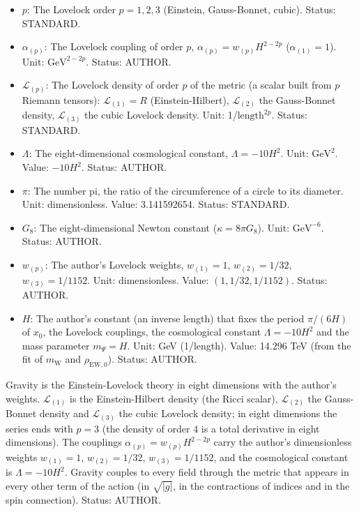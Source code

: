 \documentclass[
  10pt,
]{article}
\begin{document}
\begin{itemize}
\item
  \(p\): The Lovelock order \(p = 1, 2, 3\) (Einstein, Gauss-Bonnet,
  cubic). Status: STANDARD.
\item
  \(\alpha_{(p)}\): The Lovelock coupling of order \(p\),
  \(\alpha_{(p)} = w_{(p)}H^{2-2p}\) (\(\alpha_{(1)} = 1\)). Unit:
  \(\mathrm{GeV}^{2-2p}\). Status: AUTHOR.
\item
  \(\mathcal{L}_{(p)}\): The Lovelock density of order \(p\) of the
  metric (a scalar built from \(p\) Riemann tensors):
  \(\mathcal{L}_{(1)} = R\) (Einstein-Hilbert), \(\mathcal{L}_{(2)}\)
  the Gauss-Bonnet density, \(\mathcal{L}_{(3)}\) the cubic Lovelock
  density. Unit: 1/\(\mathrm{length}^{2p}\). Status: STANDARD.
\item
  \(\Lambda\): The eight-dimensional cosmological constant,
  \(\Lambda = -10H^2\). Unit: \(\mathrm{GeV}^{2}\). Value: \(-10H^2\).
  Status: AUTHOR.
\item
  \(\pi\): The number pi, the ratio of the circumference of a circle to
  its diameter. Unit: dimensionless. Value: 3.141592654. Status:
  STANDARD.
\item
  \(G_8\): The eight-dimensional Newton constant
  (\(\kappa = 8\pi G_8\)). Unit: \(\mathrm{GeV}^{-6}\). Status: AUTHOR.
\item
  \(w_{(p)}\): The author's Lovelock weights, \(w_{(1)} = 1\),
  \(w_{(2)} = 1/32\), \(w_{(3)} = 1/1152\). Unit: dimensionless. Value:
  \((1, 1/32, 1/1152)\). Status: AUTHOR.
\item
  \(H\): The author's constant (an inverse length) that fixes the period
  \(\pi/(6H)\) of \(x_0\), the Lovelock couplings, the cosmological
  constant \(\Lambda = -10H^2\) and the mass parameter \(m_\Psi = H\).
  Unit: GeV (1/length). Value: 14.296 TeV (from the fit of
  \(m_{\mathrm{W}}\) and \(\rho_{\mathrm{EW},0}\)). Status: AUTHOR.
\end{itemize}

Gravity is the Einstein-Lovelock theory in eight dimensions with the
author's weights. \(\mathcal{L}_{(1)}\) is the Einstein-Hilbert density
(the Ricci scalar), \(\mathcal{L}_{(2)}\) the Gauss-Bonnet density and
\(\mathcal{L}_{(3)}\) the cubic Lovelock density; in eight dimensions
the series ends with \(p = 3\) (the density of order 4 is a total
derivative in eight dimensions). The couplings
\(\alpha_{(p)} = w_{(p)}H^{2-2p}\) carry the author's dimensionless
weights \(w_{(1)} = 1\), \(w_{(2)} = 1/32\), \(w_{(3)} = 1/1152\), and
the cosmological constant is \(\Lambda = -10H^2\). Gravity couples to
every field through the metric that appears in every other term of the
action (in \(\sqrt{\lvert g\rvert}\), in the contractions of indices and
in the spin connection). Status: AUTHOR.
\end{document}
